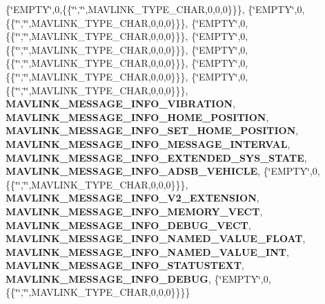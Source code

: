 \begin{DoxyCompactItemize}
\{\char`\"{}E\+M\+P\+TY\char`\"{},0,\{\{\char`\"{}\char`\"{},\char`\"{}\char`\"{},M\+A\+V\+L\+I\+N\+K\+\_\+\+T\+Y\+P\+E\+\_\+\+C\+H\+AR,0,0,0\}\}\}, \{\char`\"{}E\+M\+P\+TY\char`\"{},0,\{\{\char`\"{}\char`\"{},\char`\"{}\char`\"{},M\+A\+V\+L\+I\+N\+K\+\_\+\+T\+Y\+P\+E\+\_\+\+C\+H\+AR,0,0,0\}\}\}, \{\char`\"{}E\+M\+P\+TY\char`\"{},0,\{\{\char`\"{}\char`\"{},\char`\"{}\char`\"{},M\+A\+V\+L\+I\+N\+K\+\_\+\+T\+Y\+P\+E\+\_\+\+C\+H\+AR,0,0,0\}\}\}, \{\char`\"{}E\+M\+P\+TY\char`\"{},0,\{\{\char`\"{}\char`\"{},\char`\"{}\char`\"{},M\+A\+V\+L\+I\+N\+K\+\_\+\+T\+Y\+P\+E\+\_\+\+C\+H\+AR,0,0,0\}\}\}, \{\char`\"{}E\+M\+P\+TY\char`\"{},0,\{\{\char`\"{}\char`\"{},\char`\"{}\char`\"{},M\+A\+V\+L\+I\+N\+K\+\_\+\+T\+Y\+P\+E\+\_\+\+C\+H\+AR,0,0,0\}\}\}, \{\char`\"{}E\+M\+P\+TY\char`\"{},0,\{\{\char`\"{}\char`\"{},\char`\"{}\char`\"{},M\+A\+V\+L\+I\+N\+K\+\_\+\+T\+Y\+P\+E\+\_\+\+C\+H\+AR,0,0,0\}\}\}, \{\char`\"{}E\+M\+P\+TY\char`\"{},0,\{\{\char`\"{}\char`\"{},\char`\"{}\char`\"{},M\+A\+V\+L\+I\+N\+K\+\_\+\+T\+Y\+P\+E\+\_\+\+C\+H\+AR,0,0,0\}\}\}, \textbf{ M\+A\+V\+L\+I\+N\+K\+\_\+\+M\+E\+S\+S\+A\+G\+E\+\_\+\+I\+N\+F\+O\+\_\+\+V\+I\+B\+R\+A\+T\+I\+ON}, \textbf{ M\+A\+V\+L\+I\+N\+K\+\_\+\+M\+E\+S\+S\+A\+G\+E\+\_\+\+I\+N\+F\+O\+\_\+\+H\+O\+M\+E\+\_\+\+P\+O\+S\+I\+T\+I\+ON}, \textbf{ M\+A\+V\+L\+I\+N\+K\+\_\+\+M\+E\+S\+S\+A\+G\+E\+\_\+\+I\+N\+F\+O\+\_\+\+S\+E\+T\+\_\+\+H\+O\+M\+E\+\_\+\+P\+O\+S\+I\+T\+I\+ON}, \textbf{ M\+A\+V\+L\+I\+N\+K\+\_\+\+M\+E\+S\+S\+A\+G\+E\+\_\+\+I\+N\+F\+O\+\_\+\+M\+E\+S\+S\+A\+G\+E\+\_\+\+I\+N\+T\+E\+R\+V\+AL}, \textbf{ M\+A\+V\+L\+I\+N\+K\+\_\+\+M\+E\+S\+S\+A\+G\+E\+\_\+\+I\+N\+F\+O\+\_\+\+E\+X\+T\+E\+N\+D\+E\+D\+\_\+\+S\+Y\+S\+\_\+\+S\+T\+A\+TE}, \textbf{ M\+A\+V\+L\+I\+N\+K\+\_\+\+M\+E\+S\+S\+A\+G\+E\+\_\+\+I\+N\+F\+O\+\_\+\+A\+D\+S\+B\+\_\+\+V\+E\+H\+I\+C\+LE}, \{\char`\"{}E\+M\+P\+TY\char`\"{},0,\{\{\char`\"{}\char`\"{},\char`\"{}\char`\"{},M\+A\+V\+L\+I\+N\+K\+\_\+\+T\+Y\+P\+E\+\_\+\+C\+H\+AR,0,0,0\}\}\}, \textbf{ M\+A\+V\+L\+I\+N\+K\+\_\+\+M\+E\+S\+S\+A\+G\+E\+\_\+\+I\+N\+F\+O\+\_\+\+V2\+\_\+\+E\+X\+T\+E\+N\+S\+I\+ON}, \textbf{ M\+A\+V\+L\+I\+N\+K\+\_\+\+M\+E\+S\+S\+A\+G\+E\+\_\+\+I\+N\+F\+O\+\_\+\+M\+E\+M\+O\+R\+Y\+\_\+\+V\+E\+CT}, \textbf{ M\+A\+V\+L\+I\+N\+K\+\_\+\+M\+E\+S\+S\+A\+G\+E\+\_\+\+I\+N\+F\+O\+\_\+\+D\+E\+B\+U\+G\+\_\+\+V\+E\+CT}, \textbf{ M\+A\+V\+L\+I\+N\+K\+\_\+\+M\+E\+S\+S\+A\+G\+E\+\_\+\+I\+N\+F\+O\+\_\+\+N\+A\+M\+E\+D\+\_\+\+V\+A\+L\+U\+E\+\_\+\+F\+L\+O\+AT}, \textbf{ M\+A\+V\+L\+I\+N\+K\+\_\+\+M\+E\+S\+S\+A\+G\+E\+\_\+\+I\+N\+F\+O\+\_\+\+N\+A\+M\+E\+D\+\_\+\+V\+A\+L\+U\+E\+\_\+\+I\+NT}, \textbf{ M\+A\+V\+L\+I\+N\+K\+\_\+\+M\+E\+S\+S\+A\+G\+E\+\_\+\+I\+N\+F\+O\+\_\+\+S\+T\+A\+T\+U\+S\+T\+E\+XT}, \textbf{ M\+A\+V\+L\+I\+N\+K\+\_\+\+M\+E\+S\+S\+A\+G\+E\+\_\+\+I\+N\+F\+O\+\_\+\+D\+E\+B\+UG}, \{\char`\"{}E\+M\+P\+TY\char`\"{},0,\{\{\char`\"{}\char`\"{},\char`\"{}\char`\"{},M\+A\+V\+L\+I\+N\+K\+\_\+\+T\+Y\+P\+E\+\_\+\+C\+H\+AR,0,0,0\}\}\}\}

\end{DoxyCompactItemize}
